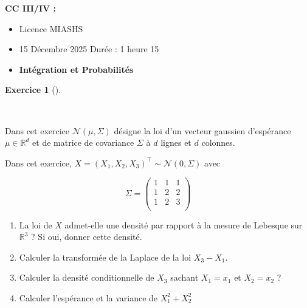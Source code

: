 \documentclass[
  french,
  11pt,
  a4paper,
  twoside,
  article,
  titlepage=false]{memoir}
\author{}
\date{2026-06-03}
\providecommand{\tightlist}{%
  \setlength{\itemsep}{0pt}\setlength{\parskip}{0pt}}
\theoremstyle{definition}
\newtheorem{exercise}{Exercice}[section]
\theoremstyle{remark}
\begin{document}
\frontmatter



\mainmatter
\begin{tcolorbox}[enhanced jigsaw, arc=.35mm, bottomrule=.15mm, breakable, colback=white, colframe=quarto-callout-note-color-frame, left=2mm, leftrule=.75mm, opacityback=0, rightrule=.15mm, toprule=.15mm]

\vspace{-3mm}\textbf{CC III/IV :}\vspace{3mm}

\begin{itemize}
\tightlist
\item
  Licence MIASHS
\item
  15 Décembre 2025 Durée : 1 heure 15
\item
  \textbf{Intégration et Probabilités}
\end{itemize}

\end{tcolorbox}

\begin{exercise}[]\protect\hypertarget{exr-1-a}{}\label{exr-1-a}

~

\end{exercise}

\begin{tcolorbox}[enhanced jigsaw, arc=.35mm, bottomrule=.15mm, breakable, colback=white, colframe=quarto-callout-note-color-frame, left=2mm, leftrule=.75mm, opacityback=0, rightrule=.15mm, toprule=.15mm]

Dans cet exercice \(\mathcal{N}(\mu, \Sigma)\) désigne la loi d'un
vecteur gaussien d'espérance \(\mu \in \mathbb{R}^d\) et de matrice de
covariance \(\Sigma\) à \(d\) lignes et \(d\) colonnes.

\end{tcolorbox}

Dans cet exercice,
\(X = (X_1, X_2, X_3)^{\top} \sim \mathcal{N}(0, \Sigma)\) avec

\[
\Sigma = 
  \begin{pmatrix} 
  1 & 1 & 1 \\ 
  1 & 2 & 2 \\ 
  1 & 2 & 3 \\ 
  \end{pmatrix}
\]

\begin{enumerate}
\def\labelenumi{\arabic{enumi}.}
\tightlist
\item
  La loi de \(X\) admet-elle une densité par rapport à la mesure de
  Lebesque sur \(\mathbb{R}^3\) ? Si oui, donner cette densité.
\item
  Calculer la transformée de la Laplace de la loi \(X_3 - X_1\).
\item
  Calculer la densité conditionnelle de \(X_3\) sachant \(X_1=x_1\) et
  \(X_2=x_2\) ?
\item
  Calculer l'espérance et la variance de \(X_1^2 + X_2^2\)
\end{enumerate}
\end{document}
